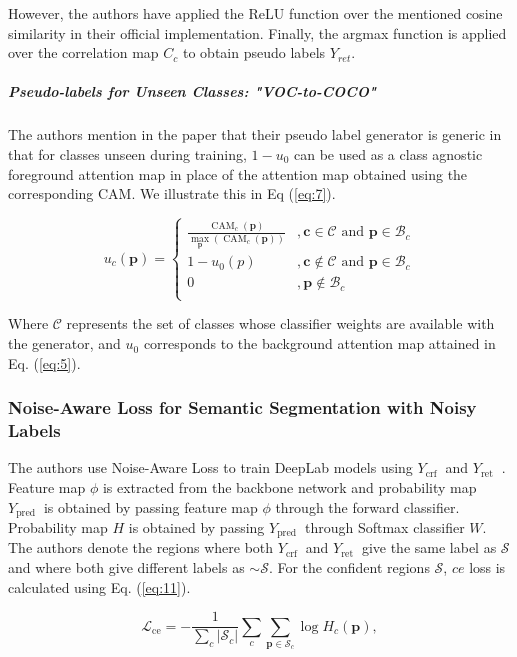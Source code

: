 However, the authors have applied the ReLU function over the mentioned cosine similarity in their official implementation. Finally, the argmax function is applied over the correlation map $C_c$ to obtain pseudo labels $Y_{ret}$.

\subparagraph*{Pseudo-labels for Unseen Classes: "VOC-to-COCO"}
The authors mention in the paper that their pseudo label generator is generic in that for classes unseen during training, $1-u_0$ can be used as a class agnostic foreground attention map in place of the attention map obtained using the corresponding CAM.
We illustrate this in Eq (\ref{eq:7}).

\begin{equation} \label{eq:7}
u_{c}(\mathbf{p})=\left\{\begin{array}{cl}
\frac{\operatorname{CAM}_{c}(\mathbf{p})}{\max _{\mathbf{p}}\left(\operatorname{CAM}_{c}(\mathbf{p})\right)} & , \mathbf{c} \in \mathcal{C} \text{ and } \mathbf{p} \in \mathcal{B}_{c} \\
1-u_0(p) & , \mathbf{c} \notin \mathcal{C} \text{ and } \mathbf{p} \in \mathcal{B}_{c}\\
0 & , \mathbf{p} \notin \mathcal{B}_{c}\\
\end{array}\right.
\end{equation}

Where $\mathcal{C}$ represents the set of classes whose classifier weights are available with the generator, and $u_0$ corresponds to the background attention map attained in Eq. (\ref{eq:5}). 

\subsubsection{Noise-Aware Loss for Semantic Segmentation with Noisy Labels}
 The authors use Noise-Aware Loss to train DeepLab \cite{deeplab} models using $Y_{\text {crf }}$ and $Y_{\text {ret }}$ . Feature map $\phi$ is extracted from the backbone network and  probability map $Y_{\text {pred }}$ is obtained by passing feature map $\phi$ through the forward classifier. Probability map $H$ is obtained by passing $Y_{\text {pred }}$ through  Softmax classifier $W$. The authors denote the regions where both $Y_{\text {crf }}$ and $Y_{\text {ret }}$ give the same label as $\mathcal{S}$ and where both give different labels as $\sim \mathcal{S}$. For the confident regions $\mathcal{S}$, $ce$ loss is calculated using Eq. (\ref{eq:11}).

\begin{equation} \label{eq:8}
\mathcal{L}_{\mathrm{ce}}=-\frac{1}{\sum_{c}\left|\mathcal{S}_{c}\right|} \sum_{c} \sum_{\mathbf{p} \in \mathcal{S}_{c}} \log H_{c}(\mathbf{p}),
\end{equation}

